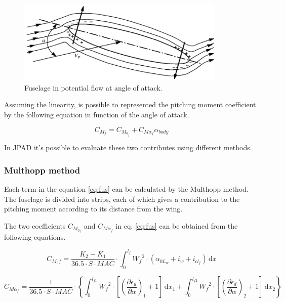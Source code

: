 \begin{figure}[H]
\centering
\includegraphics[height=4cm]{Immagini/fuse}
\caption{Fuselage in potential flow at angle of attack.}
\label{fus}
\end{figure}


Assuming the linearity, is possible to represented the pitching moment coefficient by the following equation in function of the angle of attack.

\begin{equation}
C_{M_f}=C_{M_{0_f}}+C_{{M\alpha}_f} \alpha_{body}
\label{eq:fus}
\end{equation}

In JPAD it's possible to evaluate these two contributes using different methods.

\subsubsection{Multhopp method}

Each term in the equation \ref{eq:fus} can be calculated by the Multhopp method. %
The fuselage is divided into strips, each of which gives a contribution to the pitching moment according to its distance from the wing.

The two coefficients $C_{M_{0_f}}$  and $C_{{M\alpha}_f}$ in eq. \ref{eq:fus} can be obtained from the following equations.

\begin{equation}
C_{M_{0}f}=\dfrac{K_2-K_1}{36.5\cdot S\cdot MAC}\cdot\int_0^{l_f} \! {W_f}^2\cdot\left(\alpha_{{0L}_w}+i_w+i_{{cl}_f}\right) \, \mathrm{d}x
\end{equation}

\begin{equation}
C_{{M\alpha}_f}=\dfrac{1}{36.5\cdot S\cdot MAC}\cdot \left\{ \int_0^{l_{f1}} \! {W_f}^2\cdot \left[ {\left( \dfrac{\partial \epsilon_u}{\partial \alpha} \right)}_1 +1\right] \, \mathrm{d}x_1 + \int_0^{l_{f2}} \! {W_f}^2\cdot \left[ {\left( \dfrac{\partial \epsilon_d}{\partial \alpha} \right)}_2 +1\right] \, \mathrm{d}x_2 \right\}
\end{equation}

